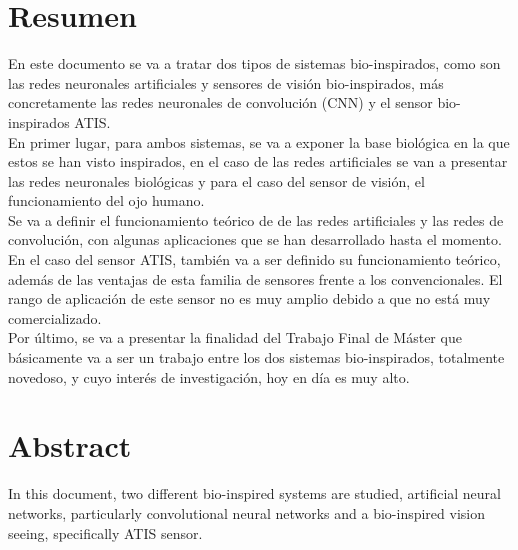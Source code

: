 \documentclass[12pt,a4paper,titlepage,twoside]{book}
\newcommand{\blankpage}{
\newpage \thispagestyle{empty}
\emph{  }
\newpage
}
\begin{document}
% 

%	


\chapter*{Resumen}
En este documento se va a tratar dos tipos de sistemas bio-inspirados, como son las redes neuronales artificiales y sensores de visión bio-inspirados, más concretamente las redes neuronales de convolución (CNN) y el sensor bio-inspirados ATIS.\\

En primer lugar, para ambos sistemas, se va a exponer la base biológica en la que estos se han visto inspirados, en el caso de las redes artificiales se van a presentar las redes neuronales biológicas y para el caso del sensor de visión, el funcionamiento del ojo humano.\\ 

Se va a definir el funcionamiento teórico de de las redes artificiales y las redes de convolución, con algunas aplicaciones que se han desarrollado hasta el momento.\\

En el caso del sensor ATIS, también va a ser definido su funcionamiento teórico, además de las ventajas de esta familia de sensores frente a los convencionales. El rango de aplicación de este sensor no es muy amplio debido a que no está muy comercializado. \\

Por último, se va a presentar la finalidad del Trabajo Final de Máster que básicamente va a ser un trabajo entre los dos sistemas bio-inspirados, totalmente novedoso, y cuyo interés de investigación, hoy en día es muy alto.\\



\chapter*{Abstract}
In this document, two different bio-inspired systems are studied, artificial neural networks, particularly convolutional neural networks and a bio-inspired vision seeing, specifically ATIS sensor. \\
\end{document}
